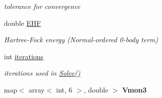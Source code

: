 \begin{DoxyCompactItemize}
\begin{DoxyCompactList}\small\item\em tolerance for convergence \end{DoxyCompactList}\item 
\hypertarget{classHartreeFock_a16c9e1791919c2ceef5584bdc9b84a81}{double \hyperlink{classHartreeFock_a16c9e1791919c2ceef5584bdc9b84a81}{E\-H\-F}}\label{classHartreeFock_a16c9e1791919c2ceef5584bdc9b84a81}

\begin{DoxyCompactList}\small\item\em Hartree-\/\-Fock energy (Normal-\/ordered 0-\/body term) \end{DoxyCompactList}\item 
\hypertarget{classHartreeFock_a7658fa0b1b05dfa7bf7b8aa7e5fd6bb3}{int \hyperlink{classHartreeFock_a7658fa0b1b05dfa7bf7b8aa7e5fd6bb3}{iterations}}\label{classHartreeFock_a7658fa0b1b05dfa7bf7b8aa7e5fd6bb3}

\begin{DoxyCompactList}\small\item\em iterations used in \hyperlink{classHartreeFock_a0666507747c17845ab4f74b97414703c}{Solve()} \end{DoxyCompactList}\item 
\hypertarget{classHartreeFock_a9a552bb58da8bf501bf97003eec73830}{map$<$ array$<$ int, 6 $>$, double $>$ {\bfseries Vmon3}}\label{classHartreeFock_a9a552bb58da8bf501bf97003eec73830}

\end{DoxyCompactItemize}


